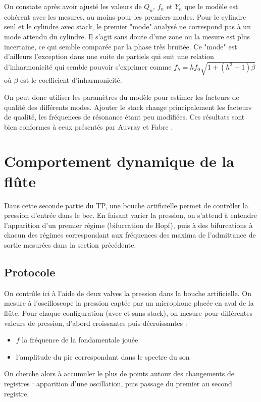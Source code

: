 \documentclass[atiam, article]{rapport} %
\begin{document}
On constate après avoir ajusté les valeurs de $Q_n$, $f_n$ et $Y_n$ que le modèle est cohérent avec les mesures, au moins pour les premiers modes. Pour le cylindre seul et le cylindre avec stack, le premier "mode" analysé ne correspond pas à un mode attendu du cylindre. Il s'agit sans doute d'une zone ou la mesure est plus incertaine, ce qui semble comparée par la phase très bruitée. Ce "mode" est d'ailleurs l'exception dans une suite de partiels qui suit une relation d'inharmonicité qui semble pouvoir s'exprimer comme $f_{h} = h f_0 \sqrt{1+(h^2-1) \beta}$ où $\beta$ est le coefficient d’inharmonicité.

On peut donc utiliser les paramètres du modèle pour estimer les facteurs de qualité des différents modes. Ajouter le stack change principalement les facteurs de qualité, les fréquences de résonance étant peu modifiées. Ces résultats sont bien conformes à ceux présentés par Auvray et Fabre \cite{Auvray2011}.

\section{Comportement dynamique de la flûte}

Dans cette seconde partie du TP, une bouche artificielle permet de contrôler la pression d'entrée dans le bec. En faisant varier la pression, on s'attend à entendre l'apparition d'un premier régime (bifurcation de Hopf), puis à des bifurcations à chacun des régimes correspondant aux fréquences des maxima de l'admittance de sortie mesurées dans la section précédente.

\subsection{Protocole}

On contrôle ici à l'aide de deux valves la pression dans la bouche artificielle. On mesure à l'oscilloscope la pression captée par un microphone placée en aval de la flûte. 
Pour chaque configuration (avec et sans stack), on mesure pour différentes valeurs de pression, d'abord croissantes puis décroissantes :

\begin{itemize}
    \item $f$ la fréquence de la fondamentale jouée
    \item l'amplitude du pic correspondant dans le spectre du son
\end{itemize}

On cherche alors à accumuler le plus de points autour des changements de registres : apparition d'une oscillation, puis passage du premier au second registre.
\end{document}
